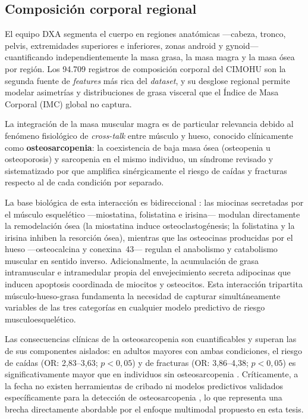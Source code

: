\documentclass[../tesis.tex]{subfiles}
\begin{document}
\subsection{Composición corporal regional}
\label{subsec:composicion}

El equipo DXA segmenta el cuerpo en regiones anatómicas ---cabeza, tronco, pelvis, extremidades
superiores e inferiores, zonas android y gynoid--- cuantificando independientemente la masa grasa,
la masa magra y la masa ósea por región.
Los 94.709 registros de composición corporal del CIMOHU son la segunda fuente de \textit{features}
más rica del \textit{dataset}, y su desglose regional permite modelar asimetrías y distribuciones
de grasa visceral que el Índice de Masa Corporal (IMC) global no captura.

La integración de la masa muscular magra es de particular relevancia debido al fenómeno fisiológico
de \textit{cross-talk} entre músculo y hueso, conocido clínicamente como \textbf{osteosarcopenia}:
la coexistencia de baja masa ósea (osteopenia u osteoporosis) y sarcopenia en el mismo individuo,
un síndrome revisado y sistematizado por \textcite{Kirk2020} que amplifica sinérgicamente el riesgo de caídas
y fracturas respecto al de cada condición por separado.

La base biológica de esta interacción es bidireccional \parencite{Kirk2020}: las miocinas secretadas
por el músculo esquelético ---miostatina, folistatina e irisina--- modulan directamente la
remodelación ósea (la miostatina induce osteoclastogénesis; la folistatina y la irisina inhiben
la resorción ósea), mientras que las osteocinas producidas por el hueso ---osteocalcina y
conexina~43--- regulan el anabolismo y catabolismo muscular en sentido inverso.
Adicionalmente, la acumulación de grasa intramuscular e intramedular propia del envejecimiento
secreta adipocinas que inducen apoptosis coordinada de miocitos y osteocitos.
Esta interacción tripartita músculo-hueso-grasa fundamenta la necesidad de capturar
simultáneamente variables de las tres categorías en cualquier modelo predictivo de riesgo
musculoesquelético.

Las consecuencias clínicas de la osteosarcopenia son cuantificables y superan las de sus componentes
aislados: en adultos mayores con ambas condiciones, el riesgo de caídas (OR: 2{,}83--3{,}63;
$p < 0{,}05$) y de fracturas (OR: 3{,}86--4{,}38; $p < 0{,}05$) es significativamente mayor
que en individuos sin osteosarcopenia \parencite{Kirk2020}.
Críticamente, a la fecha no existen herramientas de cribado ni modelos predictivos validados
específicamente para la detección de osteosarcopenia \parencite{Kirk2020}, lo que representa
una brecha directamente abordable por el enfoque multimodal propuesto en esta tesis.
\end{document}
